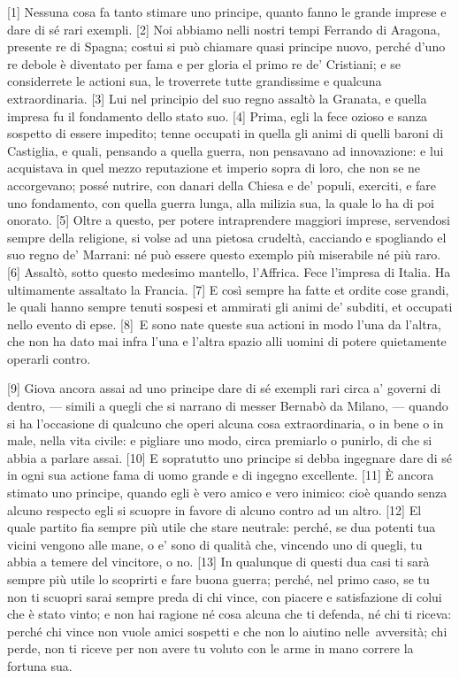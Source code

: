 
{[}1{]} Nessuna cosa fa tanto stimare uno principe, quanto fanno le
grande imprese e dare di sé rari exempli. {[}2{]} Noi abbiamo nelli
nostri tempi Ferrando di Aragona, presente re di Spagna; costui si può
chiamare quasi principe nuovo, perché d'uno re debole è diventato per
fama e per gloria el primo re de' Cristiani; e se considerrete le
actioni sua, le troverrete tutte grandissime e qualcuna extraordinaria.
{[}3{]} Lui nel principio del suo regno assaltò la Granata, e quella
impresa fu il fondamento dello stato suo. {[}4{]} Prima, egli la fece
ozioso e sanza sospetto di essere impedito; tenne occupati in quella gli
animi di quelli baroni di Castiglia, e quali, pensando a quella guerra,
non pensavano ad innovazione: e lui acquistava in quel mezzo reputazione
et imperio sopra di loro, che non se ne accorgevano; possé nutrire, con
danari della Chiesa e de' populi, exerciti, e fare uno fondamento, con
quella guerra lunga, alla milizia sua, la quale lo ha di poi onorato.
{[}5{]} Oltre a questo, per potere intraprendere maggiori imprese,
servendosi sempre della religione, si volse ad una pietosa crudeltà,
cacciando e spogliando el suo regno de' Marrani: né può essere questo
exemplo più miserabile né più raro. {[}6{]} Assaltò, sotto questo
medesimo mantello, l'Affrica. Fece l'impresa di Italia. Ha ultimamente
assaltato la Francia. {[}7{]} E così sempre ha fatte et ordite cose
grandi, le quali hanno sempre tenuti sospesi et ammirati gli animi de'
subditi, et occupati nello evento di epse. {[}8{]}\est\ E sono nate queste
sua actioni in modo l'una da l'altra, che non ha dato mai infra l'una e
l'altra spazio alli uomini di potere quietamente operarli contro.

{[}9{]} Giova ancora assai ad uno principe dare di sé exempli rari circa
a' governi di dentro, --- simili a quegli che si narrano di messer
Bernabò da Milano, --- quando si ha l'occasione di qualcuno che operi
alcuna cosa extraordinaria, o in bene o in male, nella vita civile: e
pigliare uno modo, circa premiarlo o punirlo, di che si abbia a parlare
assai. {[}10{]} E sopratutto uno principe si debba ingegnare dare di sé
in ogni sua actione fama di uomo grande e di ingegno excellente.
{[}11{]} È ancora stimato uno principe, quando egli è vero amico e vero
inimico: cioè quando senza alcuno respecto egli si scuopre in favore di
alcuno contro ad un altro. {[}12{]} El quale partito fia sempre più
utile che stare neutrale: perché, se dua potenti tua vicini vengono alle
mane, o e' sono di qualità che, vincendo uno di quegli, tu abbia a
temere del vincitore, o no. {[}13{]} In qualunque di questi dua casi ti
sarà sempre più utile lo scoprirti e fare buona guerra; perché, nel
primo caso, se tu non ti scuopri sarai sempre preda di chi vince, con
piacere e satisfazione di colui che è stato vinto; e non hai ragione né
cosa alcuna che ti defenda, né chi ti riceva: perché chi vince non vuole
amici sospetti e che non lo aiutino nelle\est\ avversità; chi perde, non ti
riceve per non avere tu voluto con le arme in mano correre la fortuna
sua.

